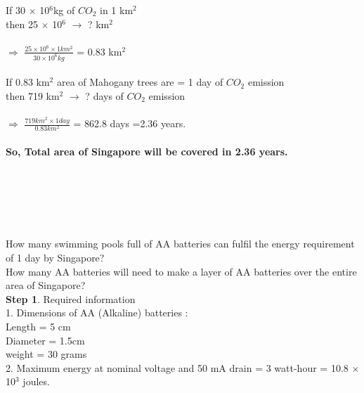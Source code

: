 \documentclass[11pt]{exam}
\begin{document}
\begin{questions}
{\begin{minipage}{42em}
                    If 30 $\times$ 10$^{6}$kg of $CO_{2}$ in 1 km$^{2}$ \\
                    then 25 $\times$ 10$^{6}$ $\rightarrow$ ? km$^{2}$ \\ \\
                    $\Rightarrow$ $\frac{25 \times 10^{6} \times 1km^{2}}{30 \times 10^{6}kg}$ = 0.83 km$^{2}$ \\ \\
                    If 0.83 km$^{2}$ area of Mahogany trees are = 1 day of $CO_{2}$ emission\\
                    then 719 km$^{2}$ $\rightarrow$ ? days of $CO_{2}$ emission \\ \\
                    $\Rightarrow$ $\frac{719 km^{2} \times  1 day}{0.83 km^{2}}$ = 862.8 days =2.36 years. \\ \\
                    \textbf{So, Total area of Singapore will be covered in 2.36 years.}                    
                 
  
\end{minipage}} \\ \\ \\ \\ \\


\question
\label{Q22:Swimming pool full of AA batteries}
How many swimming pools full of AA batteries can fulfil the energy requirement of 1 day by Singapore? \\
How many AA batteries will need to make a layer of AA batteries over the entire area of Singapore? \\
\textbf{Step 1}. Required information \\
                1. Dimensions of AA (Alkaline) batteries : \\
                   Length = 5 cm \\ Diameter = 1.5cm \\ weight = 30 grams \\
                2. Maximum energy at nominal voltage and 50 mA drain = 3 watt-hour = 10.8 $\times$ 10$^{3}$ joules. \\ \\
                

\end{questions}
\end{document}
